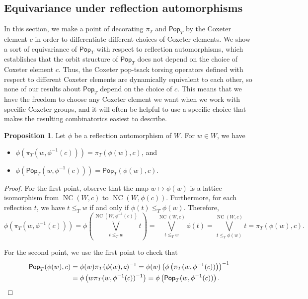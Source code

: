 \documentclass[10pt,a4paper]{amsart}
\theoremstyle{definition}
\newtheorem{prop}[prop]{Proposition}
\newcommand{\pop}{\mathsf{Pop}}
\DeclareMathOperator{\NC}{NC}
\begin{document}
\subsection{Equivariance under reflection automorphisms}

In this section, we make a point of decorating $\pi_T$ and $\pop_T$ by the Coxeter element $c$ in order to differentiate different choices of Coxeter elements.  We show a sort of equivariance of $\pop_T$ with respect to reflection automorphisms, which establishes that the orbit structure of $\pop_T$ does not depend on the choice of Coxeter element $c$.  Thus, the Coxeter pop-tsack torsing operators defined with respect to different Coxeter elements are dynamically equivalent to each other, so none of our results about $\pop_T$ depend on the choice of $c$. This means that we have the freedom to choose any Coxeter element we want when we work with specific Coxeter groups, and it will often be helpful to use a specific choice that makes the resulting combinatorics easiest to describe.

\begin{prop}  Let $\phi$ be a reflection automorphism of $W$.
For $w \in W$, we have
\begin{itemize}
\item $\phi(\pi_T(w,\phi^{-1}(c))) = \pi_T(\phi(w),c)$, and
\item $\phi(\pop_T(w,\phi^{-1}(c))) = \pop_T(\phi(w),c)$.
\end{itemize}
\label{prop:pop_props}
\end{prop}

\begin{proof}
For the first point, observe that the map $w \mapsto \phi(w)$ is a lattice isomorphism from $\NC(W,c)$ to $\NC(W,\phi(c))$.  Furthermore, for each reflection $t$, we have $t \leq_T w$ if and only if $\phi(t) \leq_T \phi(w)$.  Therefore, 
\[
\phi\left(\pi_T(w,\phi^{-1}(c))\right) = \phi\left(\bigvee_{t \leq_T w}^{\NC(W,\phi^{-1}(c))} t\right) = \bigvee_{t \leq_T w}^{\NC(W,c)} \phi(t) = \bigvee_{t \leq_T \phi(w)}^{\NC(W,c)} t = \pi_T(\phi(w),c).\]  


For the second point, we use the first point to check that 
\begin{align*}\pop_T(\phi(w),c) &= \phi(w) \pi_T(\phi(w),c)^{-1} = \phi(w) \left(\phi\left(\pi_T(w,\phi^{-1}(c))\right)\right)^{-1}\\ & = \phi\left(w\pi_T(w,\phi^{-1}( c))^{-1}\right) = \phi\left(\pop_T(w,\phi^{-1}(c))\right) .\qedhere
\end{align*}
\end{proof}
\end{document}
